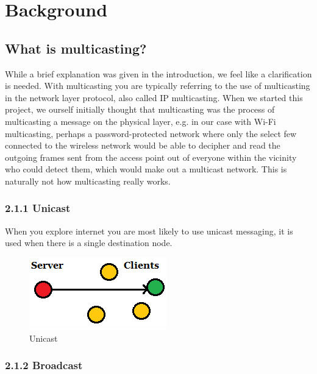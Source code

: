 \documentclass[9pt,a4paper]{acmproc}
\begin{document}
\newpage

\section{Background}

\subsection{What is multicasting?}

While a brief explanation was given in the introduction, we feel like a clarification is needed. With multicasting you are typically referring to the use of multicasting in the network layer protocol, also called IP multicasting. When we started this project, we ourself initially thought that multicasting was the process of multicasting a message on the physical layer, e.g. in our case with Wi-Fi multicasting, perhaps a password-protected network where only the select few connected to the wireless network would be able to decipher and read the outgoing frames sent from the access point out of everyone within the vicinity who could detect them, which would make out a multicast network. This is naturally not how multicasting really works.
\subsubsection*{2.1.1 Unicast}

When you explore internet you are most likely to use unicast messaging, it is used when there is a single destination node. 

\begin{figure}[h!]
  \includegraphics[width=\linewidth]{unicast.png}
  \caption{Unicast}
  \label{fig:Unicast}
\end{figure}

\subsubsection*{2.1.2 Broadcast}
\end{document}
